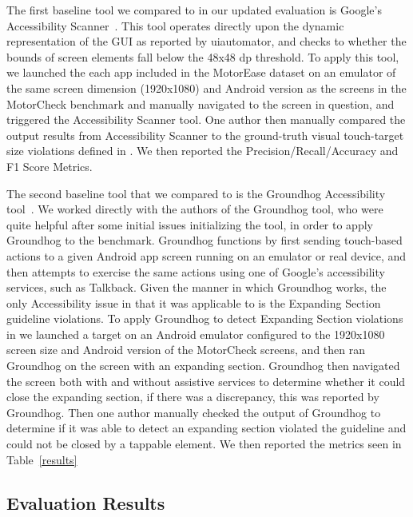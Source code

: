 The first baseline tool we compared \MotorEase to in our updated evaluation is Google's Accessibility Scanner~\cite{GoogleScanner}. This tool operates directly upon the dynamic representation of the GUI as reported by uiautomator, and checks to whether the bounds of screen elements fall below the 48x48 dp threshold. To apply this tool, we launched the each app included in the MotorEase dataset on an emulator of the same screen dimension (1920x1080) and Android version as the screens in the MotorCheck benchmark  and manually navigated to the screen in question, and triggered the Accessibility Scanner tool. One author then manually compared the output results from Accessibility Scanner to the ground-truth visual touch-target size violations defined in \MotorCheck. We then reported the Precision/Recall/Accuracy and F1 Score Metrics.

The second baseline tool that we compared \MotorEase to is the Groundhog Accessibility tool~\cite{Salehnamadi:ASE'22}. We worked directly with the authors of the Groundhog tool, who were quite helpful after some initial issues initializing the tool, in order to apply Groundhog to the \MotorCheck benchmark. Groundhog functions by first sending touch-based actions to a given Android app screen running on an emulator or real device, and then attempts to exercise the same actions using one of Google's accessibility services, such as Talkback. Given the manner in which Groundhog works, the only Accessibility issue in \MotorCheck that it was applicable to is the Expanding Section guideline violations. To apply Groundhog to detect Expanding Section violations in \MotorCheck we launched a target on an Android emulator configured to the 1920x1080 screen size and Android version of the MotorCheck screens, and then ran Groundhog on the screen with an expanding section. Groundhog then navigated the screen both with and without assistive services to determine whether it could close the expanding section, if there was a discrepancy, this was reported by Groundhog. Then one author manually checked the output of Groundhog to determine if it was able to detect an expanding section violated the \MotorCheck guideline and could not be closed by a tappable element. We then reported the metrics seen in Table~\ref{results}



\subsection{\MotorEase Evaluation Results}


